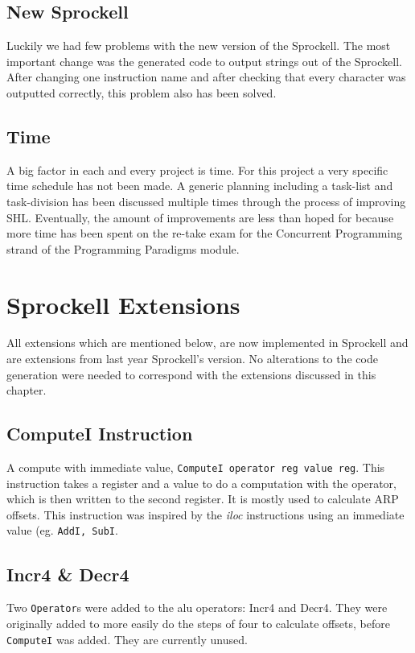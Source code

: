\documentclass[twoside]{report}
\begin{document}
\section{New Sprockell}
Luckily we had few problems with the new version of the Sprockell. The most important change was the generated code to output strings out of the Sprockell. After changing one instruction name and after checking that every character was outputted correctly, this problem also has been solved.

\section{Time}
A big factor in each and every project is time. For this project a very specific time schedule has not been made. A generic planning including a task-list and task-division has been discussed multiple times through the process of improving SHL. Eventually, the amount of improvements are less than hoped for because more time has been spent on the re-take exam for the Concurrent Programming strand of the Programming Paradigms module. 


\chapter{Sprockell Extensions}
\label{sprockell_extensions}
All extensions which are mentioned below, are now implemented in Sprockell and are extensions from last year Sprockell's version. No alterations to the code generation were needed to correspond with the extensions discussed in this chapter.
\section{ComputeI Instruction}
\label{computei_instruction}
A compute with immediate value, \texttt{ComputeI operator reg value reg}. This instruction takes a register and a value to do a computation with the operator, which is then written to the second register. It is mostly used to calculate ARP offsets. This instruction was inspired by the \emph{iloc} instructions using an immediate value (eg. \texttt{AddI, SubI}. 

\section{Incr4 \& Decr4}
\label{incr4_and_decr4}
Two \texttt{Operator}s were added to the alu operators: Incr4 and Decr4. They were originally added to more easily do the steps of four to calculate offsets, before \texttt{ComputeI} was added. They are currently unused.
\end{document}
